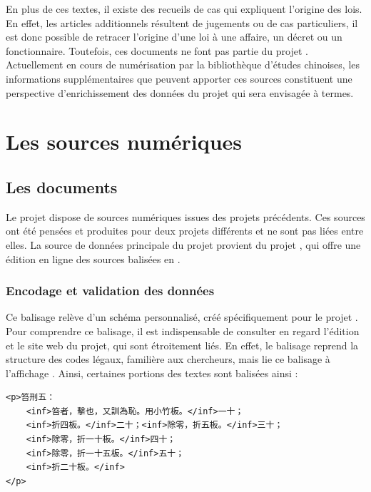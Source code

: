 En plus de ces textes, il existe des recueils de cas qui expliquent l'origine des lois. En effet, les articles additionnels résultent de jugements ou de cas particuliers, il est donc possible de retracer l'origine d'une loi à une affaire, un décret ou un fonctionnaire. Toutefois, ces documents ne font pas partie du projet \COREL. Actuellement en cours de numérisation par la bibliothèque d'études chinoises, les informations supplémentaires que peuvent apporter ces sources constituent une perspective d'enrichissement des données du projet qui sera envisagée à termes. 


\section{Les sources numériques}
    \subsection{Les documents \XML}
Le projet \COREL dispose de sources numériques issues des projets précédents. Ces sources ont été pensées et produites pour deux projets différents et ne sont pas liées entre elles. La source de données principale du projet provient du projet \LSC, qui offre une édition en ligne des sources balisées en \XML. 

\subsubsection{Encodage et validation des données}
Ce balisage \XML relève d'un schéma personnalisé, créé spécifiquement pour le projet \LSC. Pour comprendre ce balisage, il est indispensable de consulter en regard l'édition \XML et le site web du projet, qui sont étroitement liés. En effet, le balisage reprend la structure des codes légaux, familière aux chercheurs, mais lie ce balisage à l'affichage \HTML. Ainsi, certaines portions des textes sont balisées ainsi : 
\begin{verbatim}
<p>笞刑五：
    <inf>笞者，擊也，又訓為恥。用小竹板。</inf>一十；
    <inf>折四板。</inf>二十；<inf>除零，折五板。</inf>三十；
    <inf>除零，折一十板。</inf>四十；
    <inf>除零，折一十五板。</inf>五十；
    <inf>折二十板。</inf>
</p>
\end{verbatim}

